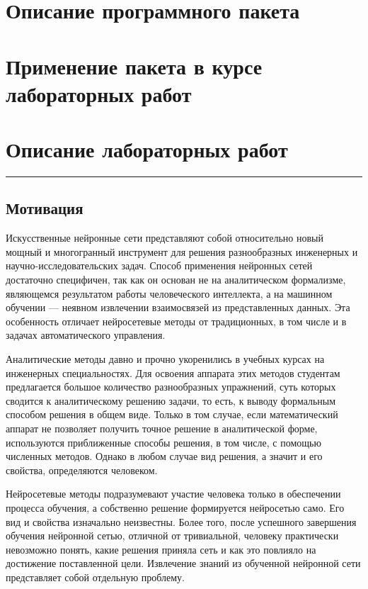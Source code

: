 \section{Описание программного пакета}


\section{Применение пакета в курсе лабораторных работ}


\section{Описание лабораторных работ}



\hrule

\subsection{Мотивация}


Искусственные нейронные сети представляют собой относительно новый
мощный и многогранный инструмент для решения разнообразных инженерных
и научно-исследовательских задач.  Способ применения нейронных сетей
достаточно специфичен, так как он основан не на аналитическом
формализме, являющемся результатом работы человеческого интеллекта, а
на машинном обучении --- неявном извлечении взаимосвязей из
представленных данных.  Эта особенность отличает нейросетевые методы
от традиционных, в том числе и в задачах автоматического управления.

Аналитические методы давно и прочно укоренились в учебных курсах на
инженерных специальностях.  Для освоения аппарата этих методов
студентам предлагается большое количество разнообразных упражнений,
суть которых сводится к аналитическому решению задачи, то есть, к
выводу формальным способом решения в общем виде.  Только в том случае,
если математический аппарат не позволяет получить точное решение в
аналитической форме, используются приближенные способы решения, в том
числе, с помощью численных методов.  Однако в любом случае вид
решения, а значит и его свойства, определяются человеком.

Нейросетевые методы подразумевают участие человека только в
обеспечении процесса обучения, а собственно решение формируется
нейросетью само.  Его вид и свойства изначально неизвестны.  Более
того, после успешного завершения обучения нейронной сетью, отличной от
тривиальной, человеку практически невозможно понять, какие решения
приняла сеть и как это повлияло на достижение поставленной цели.
Извлечение знаний из обученной нейронной сети представляет собой
отдельную проблему.

